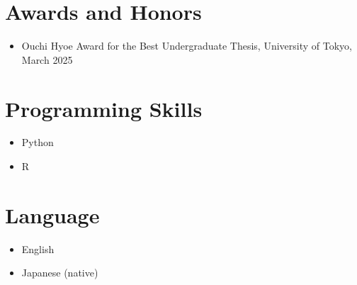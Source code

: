 \documentclass[11pt,a4paper]{article}
\begin{document}
\section*{Awards and Honors}
\begin{itemize}
    \item Ouchi Hyoe Award for the Best Undergraduate Thesis, University of Tokyo, March 2025
\end{itemize}

\section*{Programming Skills}
\begin{itemize}
    \item Python
    \item R
\end{itemize}

\section*{Language}
\begin{itemize}
    \item English
    \item Japanese (native)
\end{itemize}
\end{document}
